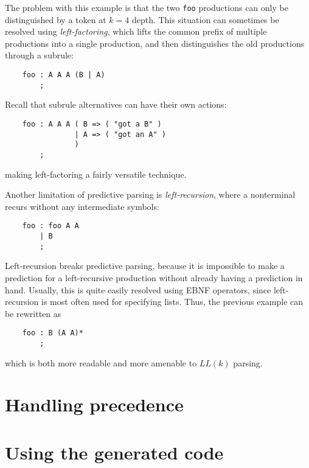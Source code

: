 The problem with this example is that the two {\tt foo} productions can only be distinguished by a token at $k = 4$ depth.  This situation can sometimes be resolved using \emph{left-factoring}, which lifts the common prefix of multiple productions into a single production, and then distinguishes the old productions through a subrule:
\begin{verbatim}
    foo : A A A (B | A)
        ;
\end{verbatim}
Recall that subrule alternatives can have their own actions:
\begin{verbatim}
    foo : A A A ( B => ( "got a B" ) 
                | A => ( "got an A" )
                )
        ;
\end{verbatim}
making left-factoring a fairly versatile technique.

Another limitation of predictive parsing is \emph{left-recursion}, where a nonterminal recurs without any intermediate symbols:
\begin{verbatim}
    foo : foo A A
        | B
        ;
\end{verbatim}
Left-recursion breaks predictive parsing, because it is impossible to make a prediction for a left-recursive production without already having a prediction in hand.  Usually, this is quite easily resolved using EBNF operators, since left-recursion is most often used for specifying lists.  Thus, the previous example can be rewritten as
\begin{verbatim}
    foo : B (A A)*
        ;
\end{verbatim}
which is both more readable and more amenable to $LL(k)$ parsing.

\section{Handling precedence}

\section{Using the generated code}

